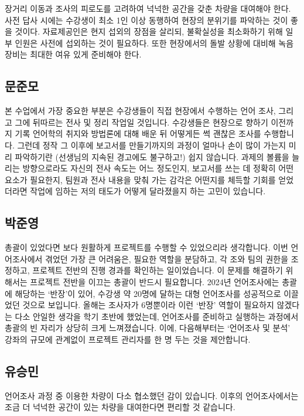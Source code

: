 장거리 이동과 조사의 피로도를 고려하여 넉넉한 공간을 갖춘 차량을 대여해야 한다. 사전 답사 시에는 수강생이 최소 1인 이상 동행하여 현장의 분위기를 파악하는 것이 좋을 것이다. 자료제공인은 현지 섭외의 장점을 살리되, 불확실성을 최소화하기 위해 일부 인원은 사전에 섭외하는 것이 필요하다. 또한 현장에서의 돌발 상황에 대비해 녹음 장비는 최대한 여유 있게 준비해야 한다.

\subsection{문준모}

본 수업에서 가장 중요한 부분은 수강생들이 직접 현장에서 수행하는 언어 조사, 그리고 그에 뒤따르는 전사 및 정리 작업일 것입니다. 수강생들은 현장으로 향하기 이전까지 기록 언어학의 취지와 방법론에 대해 배운 뒤 어떻게든 썩 괜찮은 조사를 수행합니다. 그런데 정작 그 이후에 보고서를 만들기까지의 과정이 얼마나 손이 많이 가는지 미리 파악하기란 (선생님의 지속된 경고에도 불구하고!) 쉽지 않습니다. 과제의 볼륨을 늘리는 방향으로라도 자신의 전사 속도는 어느 정도인지, 보고서를 쓰는 데 정확히 어떤 요소가 필요한지, 팀원과 전사 내용을 맞춰 가는 감각은 어떤지를 체득할 기회를 얻었더라면 작업에 임하는 저의 태도가 어떻게 달라졌을지 하는 고민이 있습니다.

\subsection{박준영}

총괄이 있었다면 보다 원활하게 프로젝트를 수행할 수 있었으리라 생각합니다. 이번 언어조사에서 겪었던 가장 큰 어려움은, 필요한 역할을 분담하고, 각 조와 팀의 권한을 조정하고, 프로젝트 전반의 진행 경과를 확인하는 일이었습니다. 이 문제를 해결하기 위해서는 프로젝트 전반을 이끄는 총괄이 반드시 필요합니다. 2024년 언어조사에는 총괄에 해당하는 `반장'이 있어, 수강생 약 20명에 달하는 대형 언어조사를 성공적으로 이끌었던 것으로 보입니다. 올해는 조사자가 6명뿐이라 이런 `반장' 역할이 필요하지 않겠다는 다소 안일한 생각을 학기 초반에 했었는데, 언어조사를 준비하고 실행하는 과정에서 총괄의 빈 자리가 상당히 크게 느껴졌습니다. 이에, 다음해부터는 `언어조사 및 분석' 강좌의 규모에 관계없이 프로젝트 관리자를 한 명 두는 것을 제안합니다.

\subsection{유승민}

언어조사 과정 중 이용한 차량이 다소 협소했던 감이 있습니다. 이후의 언어조사에서는 조금 더 넉넉한 공간이 있는 차량을 대여한다면 편리할 것 같습니다. 

